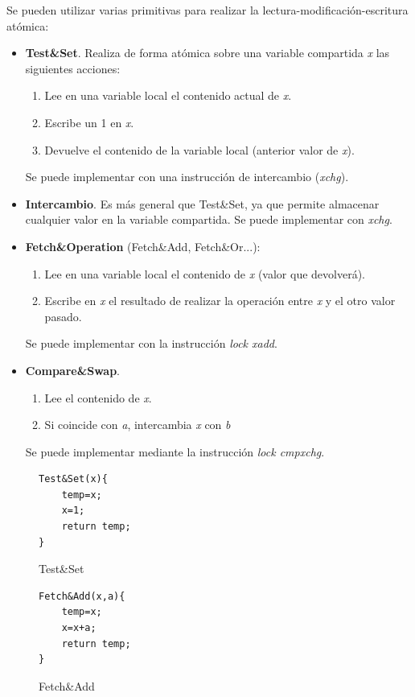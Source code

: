 \documentclass[12pt,spanish]{article}
\begin{document}
Se pueden utilizar varias primitivas para realizar la lectura-modificación-escritura atómica:

\begin{itemize}
	\item \textbf{Test\&Set}. Realiza de forma atómica sobre una variable compartida \emph{x} las siguientes acciones:
		\begin{enumerate}
			\item Lee en una variable local el contenido actual de \emph{x}.
			\item Escribe un 1 en \emph{x}.
			\item Devuelve el contenido de la variable local (anterior valor de \emph{x}).
		\end{enumerate}
		Se puede implementar con una instrucción de intercambio (\emph{xchg}).
	\item \textbf{Intercambio}. Es más general que Test\&Set, ya que permite almacenar cualquier valor en la variable compartida. Se puede implementar con \emph{xchg}.
	\item \textbf{Fetch\&Operation} (Fetch\&Add, Fetch\&Or...):
		\begin{enumerate}
			\item Lee en una variable local el contenido de \emph{x} (valor que devolverá).
			\item Escribe en \emph{x} el resultado de realizar la operación entre \emph{x} y el otro valor pasado.
		\end{enumerate}
		Se puede implementar con la instrucción \emph{lock xadd}.
		\item \textbf{Compare\&Swap}. 
		\begin{enumerate}
			\item Lee el contenido de \emph{x}.
			\item Si coincide con \emph{a}, intercambia \emph{x} con \emph{b}
		\end{enumerate}
		Se puede implementar mediante la instrucción \emph{lock cmpxchg}.
\end{itemize}

\begin{figure}[H]
\centering
\begin{verbatim}
Test&Set(x){
	temp=x;
	x=1;
	return temp;
}
\end{verbatim}
\caption{Test\&Set}
\end{figure}

\begin{figure}[H]
\centering
\begin{verbatim}
Fetch&Add(x,a){
	temp=x;
	x=x+a;
	return temp;
}
\end{verbatim}
\caption{Fetch\&Add}
\end{figure}
\end{document}
